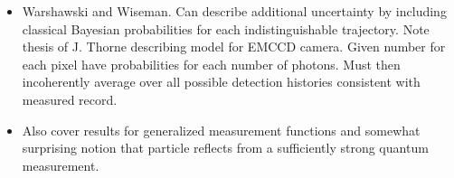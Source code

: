 \begin{itemize}
\item Warshawski and Wiseman.
  Can describe additional uncertainty by including classical Bayesian probabilities for each indistinguishable trajectory.
  Note thesis of J. Thorne describing model for EMCCD camera.
  Given number for each pixel have probabilities for each number of photons.
  Must then incoherently average over all possible detection histories consistent with measured record.
  \cite{Warszawski2002,Warszawski2003a,Warszawski2003b}
\item Also cover results for generalized measurement functions and 
somewhat surprising notion that particle reflects from a sufficiently
strong quantum measurement.
\end{itemize}







